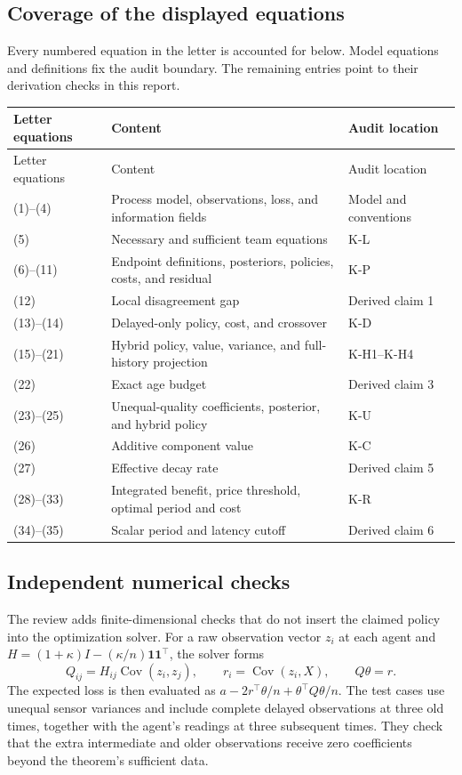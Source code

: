\documentclass[11pt,letterpaper]{article}
\newcommand{\Cov}{\operatorname{Cov}}
\newcommand{\one}{\mathbf1}
\begin{document}
\subsection{Coverage of the displayed equations}
Every numbered equation in the letter is accounted for below. Model equations and definitions fix the audit boundary. The remaining entries point to their derivation checks in this report.
\begin{longtable}{p{.15\linewidth}p{.48\linewidth}p{.27\linewidth}}
\toprule
Letter equations & Content & Audit location \\
\midrule\endfirsthead
\toprule
Letter equations & Content & Audit location \\
\midrule\endhead
\bottomrule\endfoot
(1)--(4) & Process model, observations, loss, and information fields & Model and conventions \\
(5) & Necessary and sufficient team equations & K-L \\
(6)--(11) & Endpoint definitions, posteriors, policies, costs, and residual & K-P \\
(12) & Local disagreement gap & Derived claim 1 \\
(13)--(14) & Delayed-only policy, cost, and crossover & K-D \\
(15)--(21) & Hybrid policy, value, variance, and full-history projection & K-H1--K-H4 \\
(22) & Exact age budget & Derived claim 3 \\
(23)--(25) & Unequal-quality coefficients, posterior, and hybrid policy & K-U \\
(26) & Additive component value & K-C \\
(27) & Effective decay rate & Derived claim 5 \\
(28)--(33) & Integrated benefit, price threshold, optimal period and cost & K-R \\
(34)--(35) & Scalar period and latency cutoff & Derived claim 6 \\
\end{longtable}

\subsection{Independent numerical checks}
The review adds finite-dimensional checks that do not insert the claimed policy into the optimization solver. For a raw observation vector $z_i$ at each agent and
$H=(1+\kappa)I-(\kappa/n)\one\one^\top$, the solver forms
\[
Q_{ij}=H_{ij}\Cov(z_i,z_j),\qquad r_i=\Cov(z_i,X),\qquad
Q\theta=r.
\]
The expected loss is then evaluated as
$a-2r^\top\theta/n+\theta^\top Q\theta/n$.
The test cases use unequal sensor variances and include complete delayed observations at three old times, together with the agent's readings at three subsequent times. They check that the extra intermediate and older observations receive zero coefficients beyond the theorem's sufficient data.
\end{document}
